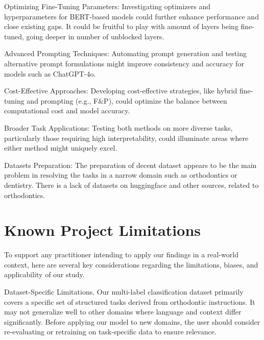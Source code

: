 \documentclass[11pt]{article}
\begin{document}
Optimizing Fine-Tuning Parameters: Investigating optimizers and hyperparameters for BERT-based models could further enhance performance and close existing gaps. It could be fruitful to play with amount of layers being fine-tuned, going deeper in number of unblocked layers.

Advanced Prompting Techniques: Automating prompt generation and testing alternative prompt formulations might improve consistency and accuracy for models such as ChatGPT-4o.

Cost-Effective Approaches: Developing cost-effective strategies, like hybrid fine-tuning and prompting (e.g., F\&P), could optimize the balance between computational cost and model accuracy.

Broader Task Applications: Testing both methods on more diverse tasks, particularly those requiring high interpretability, could illuminate areas where either method might uniquely excel.

Datasets Preparation: The preparation of decent dataset appears to be the main problem in resolving the tasks in a narrow domain such as orthodontics or dentistry. There is a lack of datasets on huggingface and other sources, related to orthodontics.

\section*{Known Project Limitations}

To support any practitioner intending to apply our findings in a real-world context, here are several key considerations regarding the limitations, biases, and applicability of our study.

Dataset-Specific Limitations. Our multi-label classification dataset primarily covers a specific set of structured tasks derived from orthodontic instructions. It may not generalize well to other domains where language and context differ significantly. Before applying our model to new domains, the user should consider re-evaluating or retraining on task-specific data to ensure relevance.
\end{document}
